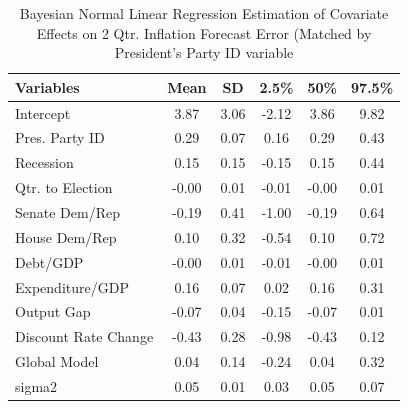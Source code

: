 \documentclass[a4paper]{article}\usepackage{graphicx, color}
\begin{document}
\begin{table}[ht]
\begin{center}
\caption{Bayesian Normal Linear Regression Estimation of Covariate Effects on 2 Qtr. Inflation Forecast Error (Matched by President's Party ID variable}
\label{OutputPB}
{\small
\begin{tabular}{lccccc}
  \hline
Variables & Mean & SD & 2.5\% & 50\% & 97.5\% \\ 
  \hline
Intercept & 3.87 & 3.06 & -2.12 & 3.86 & 9.82 \\ 
  Pres. Party ID & 0.29 & 0.07 & 0.16 & 0.29 & 0.43 \\ 
  Recession & 0.15 & 0.15 & -0.15 & 0.15 & 0.44 \\ 
  Qtr. to Election & -0.00 & 0.01 & -0.01 & -0.00 & 0.01 \\ 
  Senate Dem/Rep & -0.19 & 0.41 & -1.00 & -0.19 & 0.64 \\ 
  House Dem/Rep & 0.10 & 0.32 & -0.54 & 0.10 & 0.72 \\ 
  Debt/GDP & -0.00 & 0.01 & -0.01 & -0.00 & 0.01 \\ 
  Expenditure/GDP & 0.16 & 0.07 & 0.02 & 0.16 & 0.31 \\ 
  Output Gap & -0.07 & 0.04 & -0.15 & -0.07 & 0.01 \\ 
  Discount Rate Change & -0.43 & 0.28 & -0.98 & -0.43 & 0.12 \\ 
  Global Model & 0.04 & 0.14 & -0.24 & 0.04 & 0.32 \\ 
  sigma2 & 0.05 & 0.01 & 0.03 & 0.05 & 0.07 \\ 
   \hline
\end{tabular}
}
\end{center}
\end{table}





\clearpage



\end{document}
